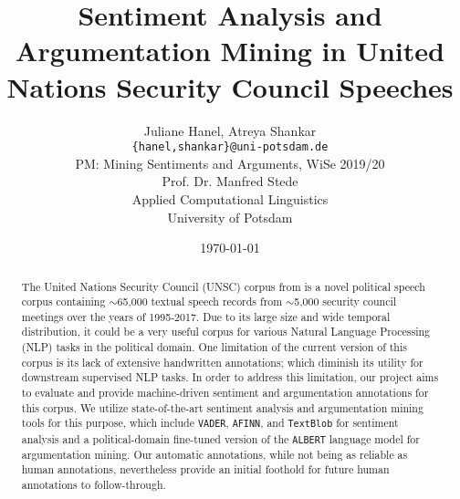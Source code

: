 \documentclass[12pt,a4paper]{article}
\title{Sentiment Analysis and Argumentation Mining in United
Nations Security Council Speeches}
\author{Juliane Hanel, Atreya Shankar\\
\texttt{\{hanel,shankar\}@uni-potsdam.de} \\
PM: Mining Sentiments and Arguments, WiSe 2019/20 \\
Prof. Dr. Manfred Stede \\
Applied Computational Linguistics\\
University of Potsdam}
\date{\today}
\begin{document}
\newgeometry{}
\maketitle
\thispagestyle{empty}
\begin{abstract}
The United Nations Security Council (UNSC) corpus from \citet{schnfeld2019security} is a novel political speech corpus containing $\sim$65,000 textual speech records from $\sim$5,000 security council meetings over the years of 1995-2017. Due to its large size and wide temporal distribution, it could be a very useful corpus for various Natural Language Processing (NLP) tasks in the political domain. One limitation of the current version of this corpus is its lack of extensive handwritten annotations; which diminish its utility for downstream supervised NLP tasks. In order to address this limitation, our project aims to evaluate and provide machine-driven sentiment and argumentation annotations for this corpus. We utilize state-of-the-art sentiment analysis and argumentation mining tools for this purpose, which include \texttt{VADER}, \texttt{AFINN}, and \texttt{TextBlob} for sentiment analysis and a political-domain fine-tuned version of the \texttt{ALBERT} language model for argumentation mining. Our automatic annotations, while not being as reliable as human annotations, nevertheless provide an initial foothold for future human annotations to follow-through.
\end{abstract}
\newpage
\restoregeometry
\thispagestyle{empty}
\tableofcontents
\newpage
\setcounter{page}{1}
\thispagestyle{plain}






\newpage
{}


\nocite{*}
\end{document}
